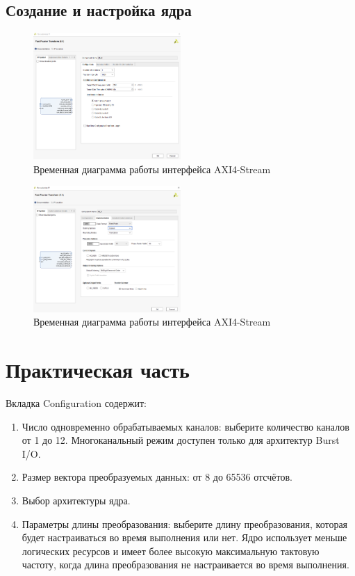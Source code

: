 \subsection{Создание и настройка ядра}

\begin{figure}[h]
	\centering
	\includegraphics[width=0.5\textwidth]{image/fft_config.png}
	\caption{Временная диаграмма работы интерфейса AXI4-Stream}
	\label{fft_config}
\end{figure}
	
\begin{figure}[h]
	\centering
	\includegraphics[width=0.5\textwidth]{image/fft_implemetation.png}
	\caption{Временная диаграмма работы интерфейса AXI4-Stream}
	\label{fft_implemetation}
\end{figure}
	
\section{Практическая часть}

Вкладка Configuration содержит:
\begin{enumerate}
	\item Число одновременно обрабатываемых каналов: выберите количество каналов от 1 до 12. Многоканальный режим доступен только для архитектур Burst I/O.
	\item Размер вектора преобразуемых данных: от 8 до 65536 отсчётов.
	\item Выбор архитектуры ядра.
	\item Параметры длины преобразования: выберите длину преобразования, которая будет настраиваться во время выполнения или нет. Ядро использует меньше логических ресурсов и имеет более высокую максимальную тактовую частоту, когда длина преобразования не настраивается во время выполнения.
\end{enumerate}

